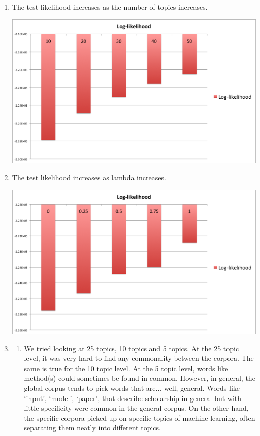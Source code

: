 \documentclass[12pt, letterpaper]{article}
\begin{document}
\begin{enumerate}[1.]
   \item 
       The test likelihood increases as the number of topics increases.

        \includegraphics[scale=0.5]{ml_graph_4}\\

   \item
       The test likelihood increases as lambda increases.

        \includegraphics[scale=0.5]{ml_graph_5}\\

   \item
      \begin{enumerate}
          \item 
              We tried looking at 25 topics, 10 topics and 5 topics. At the 25 topic level, it was very hard to find any commonality between the corpora. The same is true for the 10 topic level. At the 5 topic level, words like method(s) could sometimes be found in common. However, in general, the global corpus tends to pick words that are... well, general. Words like `input', `model', `paper', that describe scholarship in general but with little specificity were common in the general corpus. On the other hand, the specific corpora picked up on specific topics of machine learning, often separating them neatly into different topics.
      \end{enumerate}


      

\end{enumerate}
\end{document}

